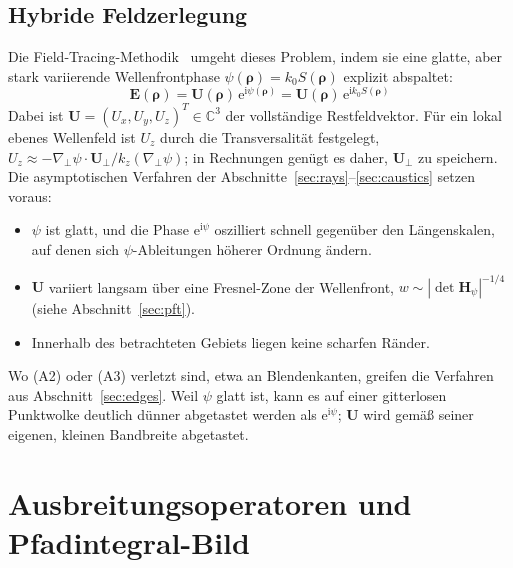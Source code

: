 \documentclass[11pt,a4paper]{scrartcl}
\theoremstyle{insightstyle}
\newcommand{\ii}{\mathrm{i}}
\newcommand{\ee}{\mathrm{e}}
\newcommand{\grad}{\nabla_{\!\perp}}
\newcommand{\Hess}{\bm{H}}
\newcommand{\rh}{\bm{\rho}}
\begin{document}
\subsection{Hybride Feldzerlegung}\label{sec:hybrid}
Die Field-Tracing-Methodik~\cite{wyrowski2011} umgeht dieses Problem, indem sie eine glatte, aber stark variierende Wellenfrontphase $\psi(\rh)=k_0S(\rh)$ explizit abspaltet:
\begin{equation}
    \boxed{\;\bm E(\rh) = \bm U(\rh)\,\ee^{\ii\psi(\rh)} = \bm U(\rh)\,\ee^{\ii k_0S(\rh)}\;}
    \label{eq:hybrid_split}
\end{equation}
Dabei ist $\bm U=(U_x,U_y,U_z)^T\in\mathbb C^3$ der vollständige Restfeldvektor. Für ein lokal ebenes Wellenfeld ist $U_z$ durch die Transversalität festgelegt, $U_z\approx-\grad\psi\cdot\bm U_\perp/k_z(\grad\psi)$; in Rechnungen genügt es daher, $\bm U_\perp$ zu speichern. Die asymptotischen Verfahren der Abschnitte~\ref{sec:rays}--\ref{sec:caustics} setzen voraus:
\begin{itemize}
    \item[(A1)] $\psi$ ist glatt, und die Phase $\ee^{\ii\psi}$ oszilliert schnell gegenüber den Längenskalen, auf denen sich $\psi$-Ableitungen höherer Ordnung ändern.
    \item[(A2)] $\bm U$ variiert langsam über eine Fresnel-Zone der Wellenfront, $w\sim|\det\Hess_\psi|^{-1/4}$ (siehe Abschnitt~\ref{sec:pft}).
    \item[(A3)] Innerhalb des betrachteten Gebiets liegen keine scharfen Ränder.
\end{itemize}
Wo (A2) oder (A3) verletzt sind, etwa an Blendenkanten, greifen die Verfahren aus Abschnitt~\ref{sec:edges}. Weil $\psi$ glatt ist, kann es auf einer gitterlosen Punktwolke deutlich dünner abgetastet werden als $\ee^{\ii\psi}$; $\bm U$ wird gemäß seiner eigenen, kleinen Bandbreite abgetastet.

\section{Ausbreitungsoperatoren und Pfadintegral-Bild}\label{sec:pathintegral}
\end{document}
